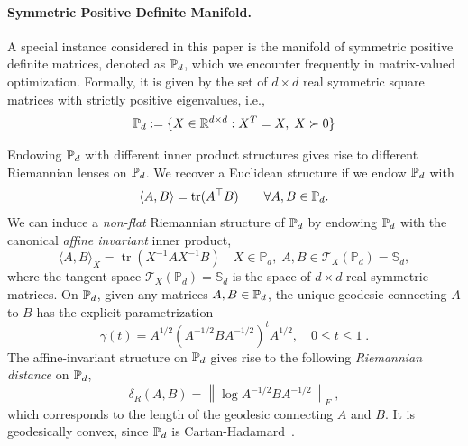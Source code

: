 \documentclass[twoside,11pt]{article}
\begin{document}
\paragraph{Symmetric Positive Definite Manifold.}
A special instance considered in this paper is the manifold of symmetric positive definite matrices, denoted as $\mathbb{P}_d$, which we encounter frequently in matrix-valued optimization. Formally, it is given by the set of $d \times d$ real symmetric square matrices with strictly positive eigenvalues, i.e., 
\begin{equation*}
    \mathbb{P}_d := \{ X \in \mathbb{R}^{d\times d}: X^T=X, \; X \succ 0 \}
\end{equation*}

Endowing $\mathbb{P}_d$ with different inner product structures gives rise to different Riemannian lenses on $\mathbb{P}_d$. We recover a Euclidean structure if we endow $\mathbb{P}_d$ with 
\[
\langle A, B \rangle = \text{tr}(A^\top B) \qquad \forall A,B \in \mathbb{P}_d.
\]
We can induce a \textit{non-flat} Riemannian structure of $\mathbb{P}_d$ by endowing $\mathbb{P}_d$ with the canonical \textit{affine invariant} inner product, 
\[\langle A, B\rangle_X=\operatorname{tr}\left(X^{-1} A X^{-1} B\right) \quad X \in \mathbb{P}_d, \; A, B \in \mathcal{T}_X\left(\mathbb{P}_d\right)=\mathbb{S}_d,\]
where the tangent space $\mathcal{T}_X\left(\mathbb{P}_d\right)=\mathbb{S}_d$ is the space of $d\times d$ real symmetric matrices. On $\mathbb{P}_d$, given any matrices $A,B \in \mathbb{P}_d$, the unique geodesic connecting $A$ to $B$ has the explicit parametrization
\begin{equation}\label{eq:intro_gcvx_def}
    \gamma(t)=A^{1 / 2}\left(A^{-1 / 2} B A^{-1 / 2}\right)^t A^{1 / 2}, \quad 0 \leq t \leq 1 \; .
\end{equation}
The affine-invariant structure on $\mathbb{P}_d$ gives rise to the following \textit{Riemannian distance} on $\mathbb{P}_d$, 
\[
\delta_{R}(A, B)=\left\|\log A^{-1 / 2} B A^{-1 / 2}\right\|_F \; ,
\]
which corresponds to the length of the geodesic connecting $A$ and $B$. It is geodesically convex, since $\mathbb{P}_d$ is Cartan-Hadamard~\citep{bacak2014convex, bhatia07positivedefinitematrices}.
\end{document}
